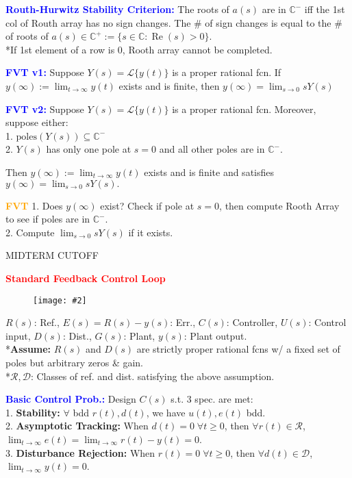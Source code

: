 \documentclass[5pt]{extarticle} %
\newcommand{\customFigure}[3][]{%
    \vspace{-1.5em}
    \begin{figure}[H]
        \centering
        \texttt{[image: \#2]}
    \end{figure}
    \vspace{-1.5em}
}
\begin{document}
\begin{paracol}{3}
{    \textcolor{blue}{\textbf{Routh-Hurwitz Stability Criterion:}} The roots of \(a(s)\) are in \(\mathbb{C}^{-}\) iff the 1st col of Routh array has no sign changes. The \# of sign changes is equal to the \# of roots of \(a(s) \in \mathbb{C}^{+} := \{ s \in \mathbb{C} : \operatorname{Re}(s) > 0 \}\). \\
    *If 1st element of a row is 0, Rooth array cannot be completed.
    
    \textcolor{blue}{\textbf{FVT v1:}} Suppose \( Y(s) = \mathcal{L}\{ y(t) \} \) is a proper rational fcn. If $y(\infty) := \lim_{t \to \infty} y(t)$ exists and is finite, then $y(\infty) = \lim_{s \to 0} s Y(s)$

    \textcolor{blue}{\textbf{FVT v2:}} Suppose \(Y(s) = \mathcal{L} \{ y(t) \}\) is a proper rational fcn. Moreover, suppose either: \\
    1. \(\text{poles}(Y(s)) \subseteq \mathbb{C}^{-}\) \\
    2. \( Y(s) \) has only one pole at \( s = 0 \) and all other poles are in \( \mathbb{C}^{-} \).

    Then \( y(\infty) := \lim_{t \to \infty} y(t) \) exists and is finite and satisfies $y(\infty) = \lim_{s \to 0} s Y(s).$
    
    \textcolor{orange}{\textbf{FVT}} 1. Does $y(\infty)$ exist? Check if pole at $s=0$, then compute Rooth Array to see if poles are in $\mathbb{C}^{-}$. \\
    2. Compute $\lim_{s \to 0} s Y(s)$ if it exists.

    \begin{center}
        MIDTERM CUTOFF
    \end{center}

    \textcolor{red}{\textbf{Standard Feedback Control Loop}}
    \customFigure[0.2]{../Images/L16_0.png}
    *$R(s)$: Ref., $E(s) = R(s) - y(s)$: Err., $C(s)$: Controller, $U(s)$: Control input, $D(s)$: Dist., $G(s)$: Plant, $y(s)$: Plant output. \\
    *\textbf{Assume:} $R(s)$ and $D(s)$ are strictly proper rational fcns w/ a fixed set of poles but arbitrary zeros \& gain. \\
    *$\mathcal{R}, \mathcal{D}$: Classes of ref. and dist. satisfying the above assumption.

    \textcolor{blue}{\textbf{Basic Control Prob.:}} Design $C(s)$ s.t. 3 spec. are met: \\
    1. \textbf{Stability:} $\forall$ bdd $r(t),d(t)$, we have $u(t),e(t)$ bdd. \\
    2. \textbf{Asymptotic Tracking:} When $d(t) = 0 \; \forall t \geq 0$, then $\forall r(t) \in \mathcal{R}$, $\lim_{t \to \infty} e(t) = \lim_{t \rightarrow \infty} r(t) - y(t) = 0$. \\
    3. \textbf{Disturbance Rejection:} When $r(t) = 0 \; \forall t \geq 0$, then $\forall d(t) \in \mathcal{D}$, $\lim_{t \to \infty} y(t) = 0$.

}
\end{paracol}
\end{document}
